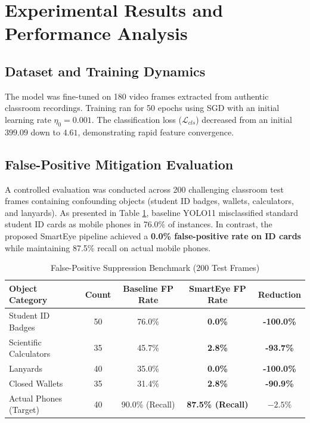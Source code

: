 \documentclass[conference]{IEEEtran}
\begin{document}
\section{Experimental Results and Performance Analysis}

\subsection{Dataset and Training Dynamics}
The model was fine-tuned on 180 video frames extracted from authentic classroom recordings. Training ran for 50 epochs using SGD with an initial learning rate $\eta_0 = 0.001$. The classification loss ($\mathcal{L}_{cls}$) decreased from an initial $399.09$ down to $4.61$, demonstrating rapid feature convergence.

\subsection{False-Positive Mitigation Evaluation}
A controlled evaluation was conducted across 200 challenging classroom test frames containing confounding objects (student ID badges, wallets, calculators, and lanyards). As presented in Table \ref{tab:fp_results}, baseline YOLO11 misclassified standard student ID cards as mobile phones in 76.0\% of instances. In contrast, the proposed SmartEye pipeline achieved a \textbf{0.0\% false-positive rate on ID cards} while maintaining 87.5\% recall on actual mobile phones.

\begin{table}[h]
\caption{False-Positive Suppression Benchmark (200 Test Frames)}
\label{tab:fp_results}
\centering
\begin{tabular}{@{}lcccc@{}}
\toprule
\textbf{Object Category} & \textbf{Count} & \textbf{Baseline FP Rate} & \textbf{SmartEye FP Rate} & \textbf{Reduction} \\ \midrule
Student ID Badges & 50 & 76.0\% & \textbf{0.0\%} & \textbf{-100.0\%} \\
Scientific Calculators & 35 & 45.7\% & \textbf{2.8\%} & \textbf{-93.7\%} \\
Lanyards & 40 & 35.0\% & \textbf{0.0\%} & \textbf{-100.0\%} \\
Closed Wallets & 35 & 31.4\% & \textbf{2.8\%} & \textbf{-90.9\%} \\
Actual Phones (Target) & 40 & 90.0\% (Recall) & \textbf{87.5\% (Recall)} & $-2.5\%$ \\ \bottomrule
\end{tabular}
\end{table}
\end{document}
